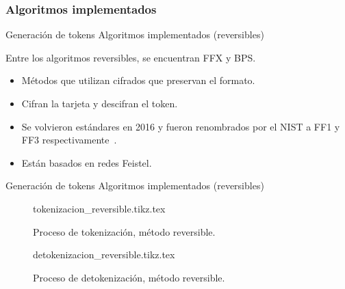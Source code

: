 %
%
%

\subsubsection{Algoritmos implementados}

\begin{frame}{Generación de tokens}
{Algoritmos implementados (reversibles)}

  Entre los algoritmos reversibles, se encuentran FFX y BPS.
  \begin{itemize}
    \item Métodos que utilizan cifrados que preservan el formato.
    \item Cifran la tarjeta y descifran el token.
    \item Se volvieron estándares en 2016 y fueron renombrados por el NIST
      a FF1 y FF3 respectivamente~\cite{nist_fpe}.
    \item Están basados en redes Feistel.
  \end{itemize}


\end{frame}

\begin{frame}{Generación de tokens}
  {Algoritmos implementados (reversibles)}
  \begin{figure}
    \centering
    {tokenizacion_reversible.tikz.tex}
    \caption{Proceso de tokenización, método reversible.}
  \end{figure}

  \begin{figure}
    \centering
    {detokenizacion_reversible.tikz.tex}
    \caption{Proceso de detokenización, método reversible.}
  \end{figure}

\end{frame}

